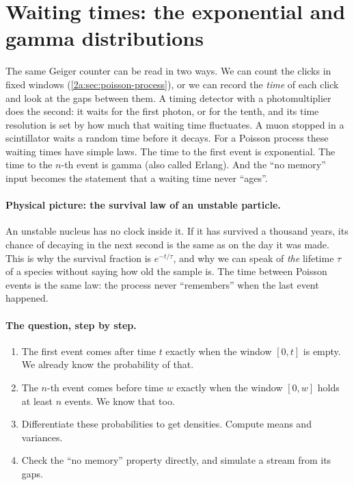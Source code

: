 \section{Waiting times: the exponential and gamma distributions}\label{2a:sec:waiting}

The same Geiger counter can be read in two ways. We can count the clicks in fixed windows (\cref{2a:sec:poisson-process}), or we can record the \emph{time} of each click and look at the gaps between them. A timing detector with a photomultiplier does the second: it waits for the first photon, or for the tenth, and its time resolution is set by how much that waiting time fluctuates. A muon stopped in a scintillator waits a random time before it decays. For a Poisson process these waiting times have simple laws. The time to the first event is exponential. The time to the $n$-th event is gamma (also called Erlang). And the ``no memory'' input becomes the statement that a waiting time never ``ages''.

\paragraph{Physical picture: the survival law of an unstable particle.}
An unstable nucleus has no clock inside it. If it has survived a thousand years, its chance of decaying in the next second is the same as on the day it was made. This is why the survival fraction is $e^{-t/\tau}$, and why we can speak of \emph{the} lifetime $\tau$ of a species without saying how old the sample is. The time between Poisson events is the same law: the process never ``remembers'' when the last event happened.

\paragraph{The question, step by step.}
\begin{enumerate}[leftmargin=1.6em,itemsep=1pt]
  \item The first event comes after time $t$ exactly when the window $[0,t]$ is empty. We already know the probability of that.
  \item The $n$-th event comes before time $w$ exactly when the window $[0,w]$ holds at least $n$ events. We know that too.
  \item Differentiate these probabilities to get densities. Compute means and variances.
  \item Check the ``no memory'' property directly, and simulate a stream from its gaps.
\end{enumerate}

